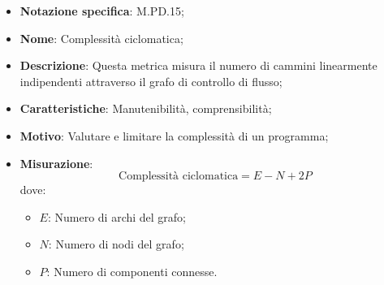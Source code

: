 \begin{itemize}
    \item \textbf{Notazione specifica}: M.PD.15;
    \item \textbf{Nome}: Complessità ciclomatica;
    \item \textbf{Descrizione}: Questa metrica misura il numero di cammini linearmente indipendenti attraverso il grafo di controllo di flusso;
    \item \textbf{Caratteristiche}: Manutenibilità, comprensibilità;
    \item \textbf{Motivo}: Valutare e limitare la complessità di un programma;
    \item \textbf{Misurazione}: 
    \[
    \text{Complessità ciclomatica} = \textit{E} - \textit{N} + \textit{2P}
    \]
    dove:
    \begin{itemize}
        \item $E$: Numero di archi del grafo;
        \item $N$: Numero di nodi del grafo;
        \item $P$: Numero di componenti connesse.
    \end{itemize}
\end{itemize}

